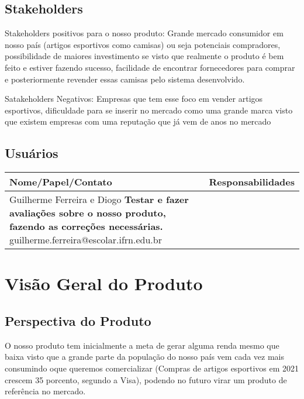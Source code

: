 \documentclass{article}
\begin{document}
\subsection{Stakeholders}

Stakeholders positivos para o nosso produto: Grande mercado consumidor em nosso país (artigos esportivos como camisas) ou seja potenciais compradores, possibilidade de maiores investimento se visto que realmente o produto é bem feito e estiver fazendo sucesso, facilidade de encontrar fornecedores para comprar e posteriormente revender essas camisas pelo sistema desenvolvido.

Satakeholders Negativos: Empresas que tem esse foco em vender artigos esportivos, dificuldade para se inserir no mercado como uma grande marca visto que existem empresas com uma reputação que já vem de anos no mercado

\subsection{Usuários}    

  \FloatBarrier
  \begin{table}[H]
    \begin{center}
      \begin{tabular}[pos]{|m{7cm} | m{9cm}|} 
        \hline
        \cellcolor[gray]{0.9}\textbf{Nome/Papel/Contato} &\cellcolor[gray]{0.9}\textbf{Responsabilidades}\\ \hline
        Guilherme Ferreira e Diogo \newline 
        \textbf{Testar e fazer avaliações sobre o nosso produto, fazendo as correções necessárias.} \newline 
        guilherme.ferreira@escolar.ifrn.edu.br & \\ \hline       
      \end{tabular}
    \end{center}
  \end{table}


\section{Visão Geral do Produto}

\subsection{Perspectiva do Produto}
O nosso produto tem inicialmente a meta de gerar alguma renda mesmo que baixa visto que a grande parte da população do nosso país vem cada vez mais consumindo oque queremos comercializar (Compras de artigos esportivos em 2021 crescem 35 porcento, segundo a Visa), podendo no futuro virar um produto de referência no mercado.
\end{document}
